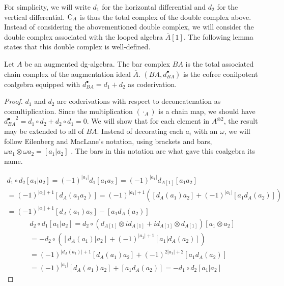 \documentclass[../thesis.tex]{subfiles}
\begin{document}
            For simplicity, we will write $d_1$ for the horizontal differential and $d_2$ for the vertical differential. $\tt{C}_A$ is thus the total complex of the double complex above. Instead of considering the abovementioned double complex, we will consider the double complex associated with the looped algebra $\overline{A}[1]$. The following lemma states that this double complex is well-defined.
            
            \begin{proposition}
                Let $A$ be an augmented dg-algebra. The bar complex $BA$ is the total associated chain complex of the augmentation ideal $\overline{A}$. $(BA, d_{BA}^\bullet)$ is the cofree conilpotent coalgebra equipped with $d_{BA}^\bullet = d_1 + d_2$ as coderivation.
            \end{proposition}

            \begin{proof}
                    $d_1$ and $d_2$ are coderivations with respect to deconcatenation as comultiplication. Since the multiplication $(\cdot_A)$ is a chain map, we should have ${d_{BA}^\bullet}^2 = d_1 \circ d_2 + d_2 \circ d_1= 0$. We will show that for each element in $A^{\otimes 2}$, the result may be extended to all of $BA$. Instead of decorating each $a_i$ with an $\omega$, we will follow Eilenberg and MacLane's notation, using brackets and bars, $\omega a_1 \otimes \omega a_2 = [a_1 | a_2]$ \cite[73]{Eilenberg53}. The bars in this notation are what gave this coalgebra its name.

                \begin{multline*}
                    d_1 \circ d_2 [a_1 | a_2] = (-1)^{|a_1|}d_1 [a_1a_2] = (-1)^{|a_1|}d_{A[1]}[a_1a_2] \\ = (-1)^{|a_1|+1}[d_A(a_1a_2)] = (-1)^{|a_1|+1}([d_A(a_1)a_2] + (-1)^{|a_1|}[a_1d_A(a_2)]) \\ = (-1)^{|a_1|+1}[d_A(a_1)a_2] - [a_1d_A(a_2)]
                \end{multline*}
                \begin{multline*}
                    d_2\circ d_1 [a_1 | a_2] = d_2\circ (d_{A[1]}\otimes id_{A[1]} + id_{A[1]}\otimes d_{A[1]}) [a_1\otimes a_2] \\ = -d_2 \circ ([d_A(a_1) | a_2] + (-1)^{|a_1|+1}[a_1 | d_A(a_2)]) \\ = (-1)^{|d_A(a_1)|+1}[d_A(a_1)a_2] + (-1)^{2|a_1|+2}[a_1d_A(a_2)] \\ = (-1)^{|a_1|}[d_A(a_1)a_2] + [a_1d_A(a_2)] = -d_1\circ d_2 [a_1 | a_2]
                \end{multline*}
            \end{proof}
\end{document}
